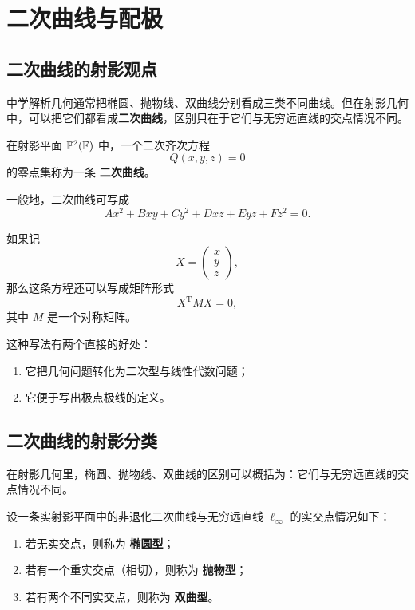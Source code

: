 \chapter{二次曲线与配极}

\section{二次曲线的射影观点}
中学解析几何通常把椭圆、抛物线、双曲线分别看成三类不同曲线。但在射影几何中，可以把它们都看成\textbf{二次曲线}，区别只在于它们与无穷远直线的交点情况不同。

\begin{definition}
在射影平面 $\mathbb{P}^2(\mathbb{F})$ 中，一个二次齐次方程
\[
Q(x,y,z)=0
\]
的零点集称为一条 \textbf{二次曲线}。
\end{definition}

一般地，二次曲线可写成
\[
Ax^2+Bxy+Cy^2+Dxz+Eyz+Fz^2=0.
\]

如果记
\[
 X=
\begin{pmatrix}
x\\ y\\ z
\end{pmatrix},
\]
那么这条方程还可以写成矩阵形式
\[
 X^{\mathrm T}M X=0,
\]
其中 $M$ 是一个对称矩阵。

这种写法有两个直接的好处：

\begin{enumerate}
    \item 它把几何问题转化为二次型与线性代数问题；
    \item 它便于写出极点极线的定义。
\end{enumerate}

\section{二次曲线的射影分类}
在射影几何里，椭圆、抛物线、双曲线的区别可以概括为：它们与无穷远直线的交点情况不同。

\begin{definition}
设一条实射影平面中的非退化二次曲线与无穷远直线 $\ell_\infty$ 的实交点情况如下：
\begin{enumerate}
    \item 若无实交点，则称为 \textbf{椭圆型}；
    \item 若有一个重实交点（相切），则称为 \textbf{抛物型}；
    \item 若有两个不同实交点，则称为 \textbf{双曲型}。
\end{enumerate}
\end{definition}

